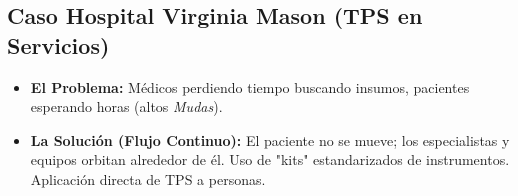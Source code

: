 \subsection{Caso Hospital Virginia Mason (TPS en Servicios)}
\begin{itemize}[itemsep=1ex]
    \item \textbf{El Problema:} Médicos perdiendo tiempo buscando insumos, pacientes esperando horas (altos \textit{Mudas}).
    \item \textbf{La Solución (Flujo Continuo):} El paciente no se mueve; los especialistas y equipos orbitan alrededor de él. Uso de "kits" estandarizados de instrumentos. Aplicación directa de TPS a personas.
\end{itemize}
